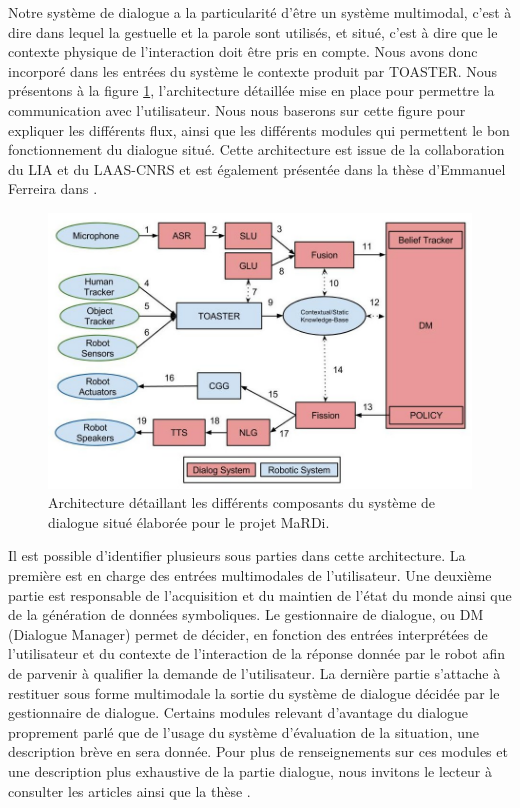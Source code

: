 \documentclass[a4paper,11pt,twoside]{StyleThese}
\begin{document}
Notre système de dialogue a la particularité d'être un système multimodal, c'est à dire dans lequel la gestuelle et la parole sont utilisés, et situé, c'est à dire que le contexte physique de l'interaction doit être pris en compte. Nous avons donc incorporé dans les entrées du système le contexte produit par TOASTER.
Nous présentons à la figure \ref{fig:archiphase1}, l'architecture détaillée mise en place pour permettre la communication avec l'utilisateur. Nous nous baserons sur cette figure pour expliquer les différents flux, ainsi que les différents modules qui permettent le bon fonctionnement du dialogue situé. Cette architecture est issue de la collaboration du LIA et du LAAS-CNRS et est également présentée dans la thèse d'Emmanuel Ferreira dans \cite{ferreira2015phd}.


\begin{figure}[ht!]
 \centering
  \includegraphics[width=0.99\linewidth]{./img/archiphase1.jpg} 
  \caption {Architecture détaillant les différents composants du système de dialogue situé élaborée pour le projet MaRDi.}
  \label{fig:archiphase1}
\end{figure}

Il est possible d'identifier plusieurs sous parties dans cette architecture.
La première est en charge des entrées multimodales de l'utilisateur. Une deuxième partie est responsable de l'acquisition et du maintien de l'état du monde ainsi que de la génération de données symboliques. Le gestionnaire de dialogue, ou DM (Dialogue Manager) permet de décider, en fonction des entrées interprétées de l'utilisateur et du contexte de l'interaction de la réponse donnée par le robot afin de parvenir à qualifier la demande de l'utilisateur.
La dernière partie s'attache à restituer sous forme multimodale la sortie du système de dialogue décidée par le gestionnaire de dialogue.
Certains modules relevant d'avantage du dialogue proprement parlé que de l'usage du système d'évaluation de la situation, une description brève en sera donnée. Pour plus de renseignements sur ces modules et une description plus exhaustive de la partie dialogue, nous invitons le lecteur à consulter les articles \cite{Ferreira13a,Ferreira13b} ainsi que la thèse \cite{ferreira2015phd}.
\end{document}
